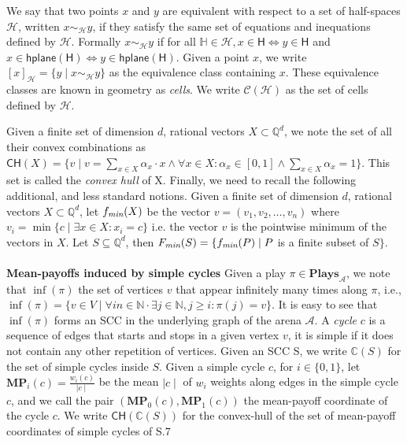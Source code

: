 We say that two points $x$ and $y$ are equivalent with respect to a set of half-spaces $\mathcal{H}$, written $x \sim_{\mathcal{H}} y$, if they satisfy the same set of equations and inequations defined by $\mathcal{H}$. Formally $x \sim_{\mathcal{H}} y$ if for all $\mathbb{H} \in \mathcal{H}, x \in \mathsf{H} \Leftrightarrow y \in \mathsf{H}$ and $x \in \mathsf{hplane}(\mathsf{H}) \Leftrightarrow y \in \mathsf{hplane}(\mathsf{H})$. Given a point $x$, we write $[x]_{\mathcal{H}} = \{y \mid x \sim_{\mathcal{H}} y\}$ as the equivalence class containing $x$. These  equivalence classes are known in geometry as \textit{cells}. We write $\mathcal{C}(\mathcal{H})$ as the set of cells defined by $\mathcal{H}$.

Given a finite set of dimension $d$, rational vectors $X \subset \mathbb{Q}^d$, we note the set of all their convex combinations as $\mathsf{CH}(X) = \{v \mid v = \sum_{x \in X} \alpha_x\cdot x \land \forall x \in X: \alpha_x \in [0,1] \land \sum_{x \in X}\alpha_x = 1\}$. This set is called the \textit{convex hull} of X. Finally, we need to recall the following additional, and less standard notions. Given a finite set of dimension $d$, rational vectors $X \subset \mathbb{Q}^d$, let $f_{\emph{min}}(X)$ be the vector $v = (v_1, v_2, \dots , v_n)$ where $v_i = \min \{c \mid \exists x \in X: x_i = c \}$ i.e. the vector $v$ is the pointwise minimum of the vectors in $X$. Let $S \subseteq \mathbb{Q}^d$, then $F_{\emph{min}}(S) = \{ f_{\emph{min}}(P) \mid P $ is a finite subset of $S\}$.
\\
\\
\textbf{Mean-payoffs induced by simple cycles} Given a play $\pi \in \mathbf{Plays}_{\mathcal{A}}$, we note that $\inf(\pi)$ the set of vertices $v$ that appear infinitely many times along $\pi$, i.e., $\inf(\pi) = \{v \in V \mid \forall in \in \mathbb{N}\cdot \exists j \in \mathbb{N}, j \geqslant i: \pi(j) = v \}$. It is easy to see that $\inf(\pi)$ forms an SCC in the underlying graph of the arena $\mathcal{A}$. A \textit{cycle} $c$ is a sequence of edges that starts and stops in a given vertex $v$, it is simple if it does not contain any other repetition of vertices. Given an SCC S, we write $\mathbb{C}(S)$ for the set of simple cycles inside $S$. Given a simple cycle $c$, for $i \in \{0,1\}$, let $\mathbf{MP}_i(c) = \frac{w_i(c)}{\mid c \mid}$ be the mean $\mid c \mid$ of $w_i$ weights along edges in the simple cycle $c$, and we call the pair $(\mathbf{MP}_0(c), \mathbf{MP}_1(c))$ the mean-payoff coordinate of the cycle $c$. We write $\mathsf{CH}(\mathbb{C}(S))$ for the convex-hull of the set of mean-payoff coordinates of simple cycles of S.7

